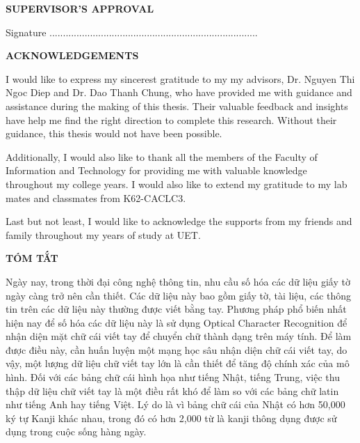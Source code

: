 \documentclass[12pt]{report}
\begin{document}
\begin{center}
	\textbf{\large SUPERVISOR'S APPROVAL}
\end{center}


\emph{
}
\bigskip
\bigskip
\bigskip

Signature .............................................................................

\clearpage  %

\newpage
{}
\begin{center}
	\textbf{\large ACKNOWLEDGEMENTS}
\end{center}
I would like to express my sincerest gratitude to my my advisors, Dr. Nguyen Thi Ngoc Diep and Dr. Dao Thanh Chung, who have provided me with guidance and assistance during the making of this thesis. Their valuable feedback and insights have help me find the right direction to complete this research. Without their guidance, this thesis would not have been possible.

Additionally, I would also like to thank all the members of the Faculty of Information and Technology for providing me with valuable knowledge throughout my college years. I would also like to extend my gratitude to my lab mates and classmates from K62-CACLC3.

Last but not least, I would like to acknowledge the supports from my friends and family throughout my years of study at UET.
	
\newpage
\begin{center}
	\textbf{\large TÓM TẮT}
\end{center}
Ngày nay, trong thời đại công nghệ thông tin, nhu cầu số hóa các dữ liệu giấy tờ ngày càng trở nên cần thiết. Các dữ liệu này bao gồm giấy tờ, tài liệu, các thông tin trên các dữ liệu này thường được viết bằng tay. Phương pháp phổ biến nhất hiện nay để số hóa các dữ liệu này
là sử dụng Optical Character Recognition để nhận diện mặt chữ cái viết tay để chuyển chữ thành dạng trên máy tính. Để làm được điều này, cần huấn luyện một mạng học sâu nhận diện chữ cái viết tay, do vậy, một lượng dữ liệu chữ viết tay lớn là cần thiết để tăng độ chính xác của mô hình. Đối với các bảng chữ cái hình họa như tiếng Nhật, tiếng Trung, việc thu thập dữ liệu chữ viết tay là một điều rất khó để làm so với các bảng chữ latin như tiếng Anh hay tiếng Việt. Lý do là vì bảng chữ cái của Nhật có hơn 50,000 ký tự Kanji khác nhau, trong đó có hơn 2,000 từ là kanji thông dụng được sử dụng trong cuộc sống hàng ngày.
\end{document}
